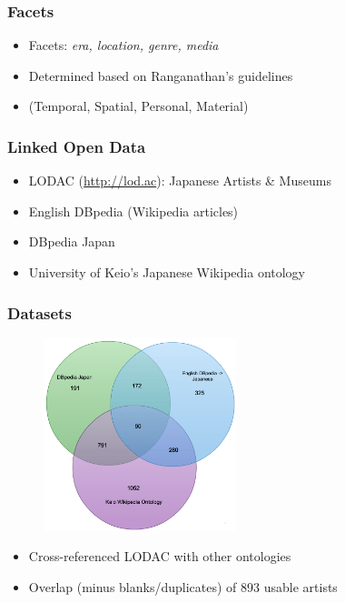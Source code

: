 \documentclass{beamer}
\begin{document}
\begin{frame}
    \frametitle{Facets}
        \begin{itemize}
          \item Facets: \emph{era, location, genre, media}
            \item Determined based on Ranganathan's \cite{ranganathan} guidelines
            \item (Temporal, Spatial, Personal, Material)
        \end{itemize}
\end{frame}

\begin{frame}
    \frametitle{Linked Open Data}
        \begin{itemize}
            \item LODAC (\url{http://lod.ac}): Japanese Artists \& Museums
            \item English DBpedia (Wikipedia articles)
            \item DBpedia Japan
            \item University of Keio's Japanese Wikipedia ontology
        \end{itemize}
\end{frame}

\begin{frame}
    \frametitle{Datasets}
    \begin{figure}
        \centering
        \includegraphics[width=0.5\textwidth]{venn.png}
    \end{figure}
        \begin{itemize}
            \item Cross-referenced LODAC with other ontologies
            \item Overlap (minus blanks/duplicates) of 893 usable artists
        \end{itemize}
\end{frame}
\end{document}
